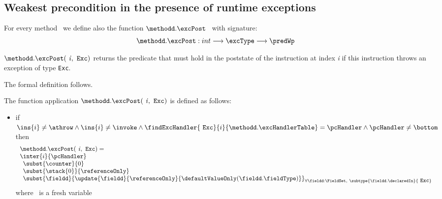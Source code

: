 

\subsection{Weakest precondition in the presence of runtime exceptions}\label{wp:interExc} 

For every method \methodd \  we define also the function $ \methodd.\excPost $ \ with signature:
$$\methodd.\excPost : int   \longrightarrow \excType \longrightarrow  \predWp  $$
 
$ \methodd.\excPost(\mbox{ \rm \textit{i}},  \mbox{ \rm \texttt{Exc}})$ 
returns the predicate that must hold in the poststate of the instruction at index \textit{i} if this instruction throws an exception of
type \texttt{Exc}.

The formal definition follows.
\begin{defExc}\label{defExc}
The function application $\methodd.\excPost( \mbox{ \rm \textit{i}} ,  \mbox{ \rm \texttt{Exc}} )   $ is defined as follows:
 \begin{itemize}
    \item if $  \ins{i} \neq \athrow \wedge \ins{i} \neq \invoke \wedge   \findExcHandler{\mbox{ \rm \texttt{Exc}} }{i}{\methodd.\excHandlerTable} = \pcHandler \wedge \pcHandler \neq \bottom    $ then 
      $$ \begin{array}{l}
           \methodd.\excPost( \mbox{ \rm \textit{i}} ,  \mbox{ \rm \texttt{Exc}}) = \\
           \inter{i}{\pcHandler}\\
                      \begin{array}{l}
                        \subst{\counter}{0} \\
			\subst{\stack{0}}{\referenceOnly} \\
                         \subst{ \fieldd} { \update{\fieldd} { \referenceOnly }{\defaultValueOnly( \fieldd.  \fieldType ) } }_{{\small \forall \fieldd : \FieldSet, \ 
                         \subtype{\fieldd.\declaredIn}{ \mbox{ \rm \texttt{Exc}}} } } 
                       \end{array} 
        \end{array}$$   
	where  \ is a fresh variable

   



\end{itemize}
\end{defExc}
